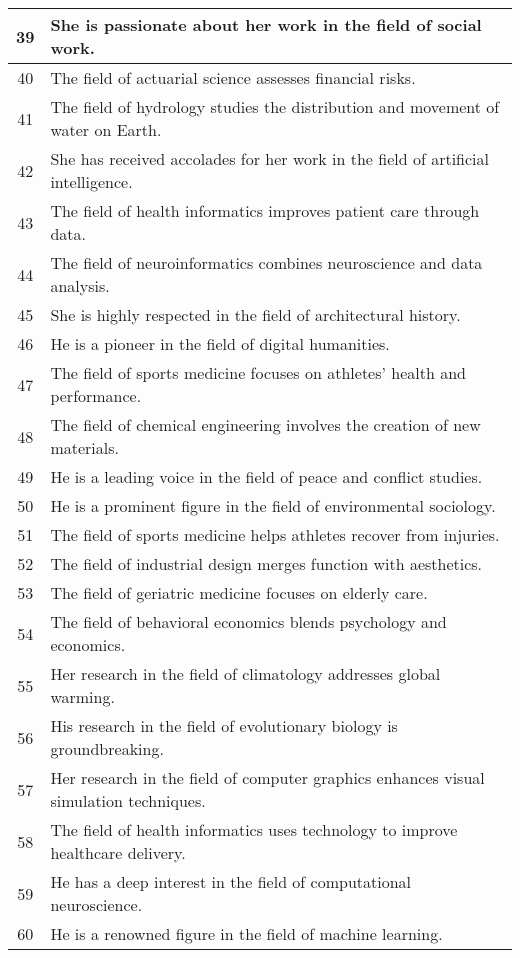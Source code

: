 \begin{longtable}{|c|p{12cm}|}
39 & She is passionate about her work in the field of social work. \\ \hline
40 & The field of actuarial science assesses financial risks. \\ \hline
41 & The field of hydrology studies the distribution and movement of water on Earth. \\ \hline
42 & She has received accolades for her work in the field of artificial intelligence. \\ \hline
43 & The field of health informatics improves patient care through data. \\ \hline
44 & The field of neuroinformatics combines neuroscience and data analysis. \\ \hline
45 & She is highly respected in the field of architectural history. \\ \hline
46 & He is a pioneer in the field of digital humanities. \\ \hline
47 & The field of sports medicine focuses on athletes' health and performance. \\ \hline
48 & The field of chemical engineering involves the creation of new materials. \\ \hline
49 & He is a leading voice in the field of peace and conflict studies. \\ \hline
50 & He is a prominent figure in the field of environmental sociology. \\ \hline
51 & The field of sports medicine helps athletes recover from injuries. \\ \hline
52 & The field of industrial design merges function with aesthetics. \\ \hline
53 & The field of geriatric medicine focuses on elderly care. \\ \hline
54 & The field of behavioral economics blends psychology and economics. \\ \hline
55 & Her research in the field of climatology addresses global warming. \\ \hline
56 & His research in the field of evolutionary biology is groundbreaking. \\ \hline
57 & Her research in the field of computer graphics enhances visual simulation techniques. \\ \hline
58 & The field of health informatics uses technology to improve healthcare delivery. \\ \hline
59 & He has a deep interest in the field of computational neuroscience. \\ \hline
60 & He is a renowned figure in the field of machine learning. \\ \hline

\end{longtable}
